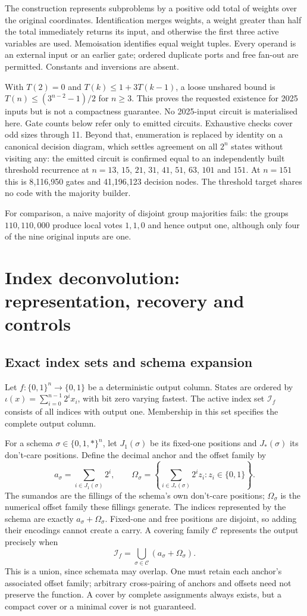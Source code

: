 \documentclass[11pt,a4paper]{article}
\begin{document}
The construction represents subproblems by a positive odd total of weights
over the original coordinates. Identification merges weights, a weight greater
than half the total immediately returns its input, and otherwise the first
three active variables are used. Memoisation identifies equal weight tuples.
Every operand is an external input or an earlier gate; ordered duplicate ports
and free fan-out are permitted. Constants and inversions are absent.

With $T(2)=0$ and $T(k)\le1+3T(k-1)$, a loose unshared bound is
$T(n)\le(3^{n-2}-1)/2$ for $n\ge3$. This proves the requested existence for
2025 inputs but is not a compactness guarantee. No 2025-input circuit is
materialised here. Gate counts below refer only to emitted circuits. Exhaustive
checks cover odd sizes through 11. Beyond that, enumeration is replaced by
identity on a canonical decision diagram, which settles agreement on all $2^n$
states without visiting any: the emitted circuit is confirmed equal to an
independently built threshold recurrence at $n=13$, $15$, $21$, $31$, $41$,
$51$, $63$, $101$ and $151$. At $n=151$ this is 8{,}116{,}950 gates and
41{,}196{,}123 decision nodes. The threshold target shares no code with the
majority builder.

For comparison, a naive majority of disjoint group majorities fails: the
groups $110,110,000$ produce local votes $1,1,0$ and hence output one, although
only four of the nine original inputs are one.

\section{Index deconvolution: representation, recovery and controls}
\subsection{Exact index sets and schema expansion}
Let $f:\{0,1\}^n\to\{0,1\}$ be a deterministic output column. States are
ordered by $\iota(x)=\sum_{i=0}^{n-1}2^ix_i$, with bit zero varying fastest.
The active index set $\mathcal I_f$ consists of all indices with output one.
Membership in this set specifies the complete output column.

For a schema $\sigma\in\{0,1,*\}^n$, let $J_1(\sigma)$ be its fixed-one
positions and $J_*(\sigma)$ its don't-care positions. Define the decimal
anchor and the offset family by
\[
 a_\sigma=\sum_{i\in J_1(\sigma)}2^i,\qquad
 \Omega_\sigma=\left\{\sum_{i\in J_*(\sigma)}2^i z_i:z_i\in\{0,1\}\right\}.
\]
The sumandos are the fillings of the schema's own don't-care positions;
$\Omega_\sigma$ is the numerical offset family these fillings generate.
The indices represented by the schema are exactly
$a_\sigma+\Omega_\sigma$. Fixed-one and free positions are disjoint, so
adding their encodings cannot create a carry. A covering family $\mathcal C$
represents the output precisely when
\[
\mathcal I_f=\bigcup_{\sigma\in\mathcal C}(a_\sigma+\Omega_\sigma).
\]
This is a union, since schemata may overlap. One must retain each anchor's
associated offset family; arbitrary cross-pairing of anchors and offsets
need not preserve the function. A cover by complete assignments always
exists, but a compact cover or a minimal cover is not guaranteed.
\end{document}
